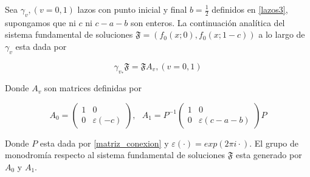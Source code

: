  \begin{thm}
 Sea $\gamma_{v}, (v=0,1) $ lazos con punto inicial y final $b=\frac{1}{2}$ definidos en \ref{lazos3}, supongamos que ni $c$ ni $c-a-b$ son enteros. La continuaci\'on anal\'itica del sistema fundamental de soluciones $\mathfrak{F}=(f_{0}(x;0),f_{0}(x;1-c))$ a lo largo de $\gamma_{v}$ esta dada por

 $$\label{sistema_soluciones_continuacion_analitica} \gamma_{v_{*}} \mathfrak{F} = \mathfrak{F} A_{v} , (v=0,1)$$

 Donde $A_{v} $ son matrices definidas por

 $$ \label{Matrices_teorema_monodromia_grupo}  A_{0} =  \begin{pmatrix}
 1& 0\\
 0& \varepsilon (-c)
 \end{pmatrix}  ,\ \ \
A_{1} = P ^{-1}\begin{pmatrix}
 1& 0\\
 0& \varepsilon (c-a-b)
 \end{pmatrix} P
$$

Donde $P$ esta dada por \ref{matriz_conexion} y $\varepsilon(\cdot) = exp(2 \pi i \cdot )$. El grupo de monodrom\'ia respecto al sistema fundamental de soluciones $\mathfrak{F} $ esta generado por $A_{0}$ y $A_{1}$.
 \end{thm}

